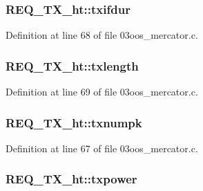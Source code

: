 \subsubsection[{\texorpdfstring{txifdur}{txifdur}}]{ R\+E\+Q\+\_\+\+T\+X\+\_\+ht\+::txifdur}\hypertarget{struct_r_e_q___t_x__ht_a01136c9dfea9e9d4b5c07b27bbbd9663}{}\label{struct_r_e_q___t_x__ht_a01136c9dfea9e9d4b5c07b27bbbd9663}


Definition at line 68 of file 03oos\+\_\+mercator.\+c.

\subsubsection[{\texorpdfstring{txlength}{txlength}}]{ R\+E\+Q\+\_\+\+T\+X\+\_\+ht\+::txlength}\hypertarget{struct_r_e_q___t_x__ht_aa0e131a829a40e3458e9c90df6a1fb6e}{}\label{struct_r_e_q___t_x__ht_aa0e131a829a40e3458e9c90df6a1fb6e}


Definition at line 69 of file 03oos\+\_\+mercator.\+c.

\subsubsection[{\texorpdfstring{txnumpk}{txnumpk}}]{ R\+E\+Q\+\_\+\+T\+X\+\_\+ht\+::txnumpk}\hypertarget{struct_r_e_q___t_x__ht_af4641683362ba6d5583558927f6b774f}{}\label{struct_r_e_q___t_x__ht_af4641683362ba6d5583558927f6b774f}


Definition at line 67 of file 03oos\+\_\+mercator.\+c.

\subsubsection[{\texorpdfstring{txpower}{txpower}}]{ R\+E\+Q\+\_\+\+T\+X\+\_\+ht\+::txpower}\hypertarget{struct_r_e_q___t_x__ht_a5304263e364d8eb01026fa8375b48c04}{}\label{struct_r_e_q___t_x__ht_a5304263e364d8eb01026fa8375b48c04}


